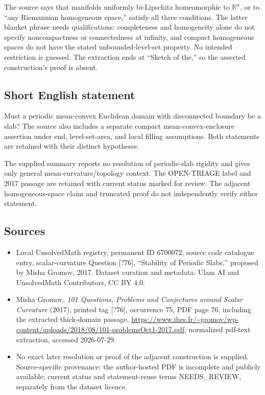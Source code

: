 \documentclass[11pt]{article}
\newcommand{\R}{\mathbb{R}}
\begin{document}
The source says that manifolds uniformly bi-Lipschitz homeomorphic to $\R^n$, or to ``any Riemannian homogeneous space,'' satisfy all three conditions. The latter blanket phrase needs qualifications: completeness and homogeneity alone do not specify noncompactness or connectedness at infinity, and compact homogeneous spaces do not have the stated unbounded-level-set property. No intended restriction is guessed. The extraction ends at ``Sketch of the,'' so the asserted construction's proof is absent.
\subsection{Short English statement}
Must a periodic mean-convex Euclidean domain with disconnected boundary be a slab? The source also includes a separate compact mean-convex-enclosure assertion under end, level-set-area, and local filling assumptions. Both statements are retained with their distinct hypotheses.

The supplied summary reports no resolution of periodic-slab rigidity and gives only general mean-curvature/topology context. The OPEN-TRIAGE label and 2017 passage are retained with current status marked for review. The adjacent homogeneous-space claim and truncated proof do not independently verify either statement.
\subsection{Sources}
\begin{itemize}
\item Local UnsolvedMath registry, permanent ID 6700072, source code catalogue entry, scalar-curvature Question [?76], ``Stability of Periodic Slabs,'' proposed by Misha Gromov, 2017. Dataset curation and metadata: Ulam AI and UnsolvedMath Contributors, CC BY 4.0.
\item Misha Gromov, \emph{101 Questions, Problems and Conjectures around Scalar Curvature} (2017), printed tag [?76], occurrence 75, PDF page 76, including the extracted thick-domain passage, \url{https://www.ihes.fr/~gromov/wp-content/uploads/2018/08/101-problemsOct1-2017.pdf}; normalized pdf-text extraction, accessed 2026-07-29.
\item No exact later resolution or proof of the adjacent construction is supplied. Source-specific provenance: the author-hosted PDF is incomplete and publicly available; current status and statement-reuse terms NEEDS\_REVIEW, separately from the dataset licence.
\end{itemize}
\end{document}
